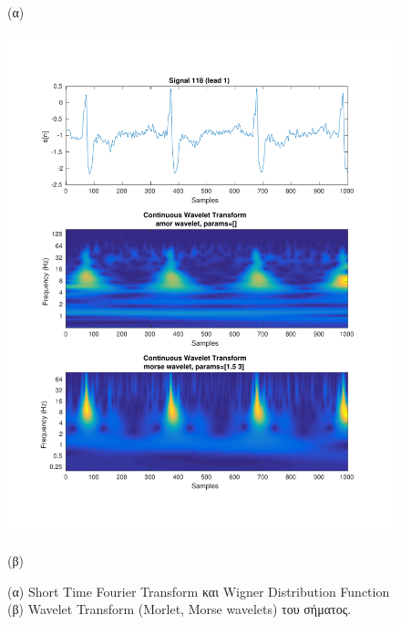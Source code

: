 \documentclass[11pt,a4paper]{article}
\begin{document}
\begin{figure}[H]
\begin{minipage}{0.48\textwidth}
	(α)
\end{minipage}
\begin{minipage}{0.48\textwidth}
	\centering
	\includegraphics[width=\textwidth]{fig/118l1_cwt.pdf}
	
	(β)
\end{minipage}
\vfill
\caption{(α) Short Time Fourier Transform και Wigner Distribution Function (β) Wavelet Transform (Morlet, Morse wavelets) του σήματος.}
\label{fig:118l1_stft_wdf_wt}
\end{figure}
\end{document}
